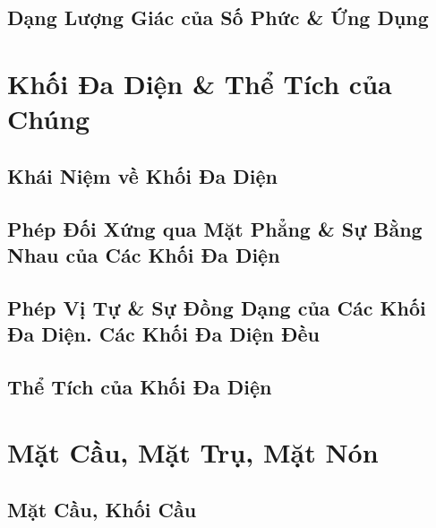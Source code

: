 \documentclass[12pt]{article}
\numberwithin{equation}{section}
\begin{document}

\subsection{Dạng Lượng Giác của Số Phức \& Ứng Dụng}


\section{Khối Đa Diện \& Thể Tích của Chúng}

\subsection{Khái Niệm về Khối Đa Diện}


\subsection{Phép Đối Xứng qua Mặt Phẳng \& Sự Bằng Nhau của Các Khối Đa Diện}


\subsection{Phép Vị Tự \& Sự Đồng Dạng của Các Khối Đa Diện. Các Khối Đa Diện Đều}


\subsection{Thể Tích của Khối Đa Diện}


\section{Mặt Cầu, Mặt Trụ, Mặt Nón}

\subsection{Mặt Cầu, Khối Cầu}
\end{document}
